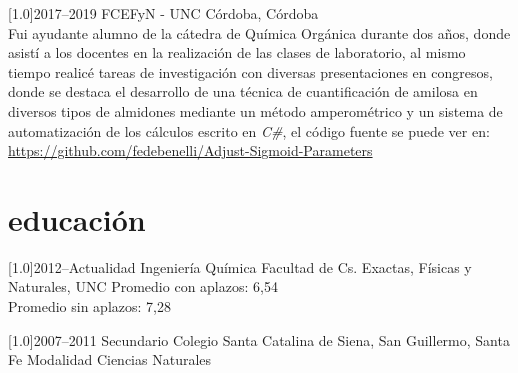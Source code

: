 \documentclass[espanol]{cv-style}     %
\begin{document}
\begin{entrylist}
\entry
  {\scalebox{.8}[1.0]{2017--2019}}
  {FCEFyN - UNC}
  {Córdoba, Córdoba}  {\\
	  Fui ayudante alumno de la cátedra de Química Orgánica durante dos años, donde asistí a los docentes en la realización de las clases de laboratorio, al mismo tiempo realicé tareas de investigación con diversas presentaciones en congresos, donde se destaca el desarrollo de una técnica de cuantificación de amilosa en diversos tipos de almidones mediante un método amperométrico y un sistema de automatización de los cálculos escrito en \textit{C\#}, el código fuente se puede ver en: 
	  \url{https://github.com/fedebenelli/Adjust-Sigmoid-Parameters} 
  }

\end{entrylist}

\newpage




\section{educación}
\begin{entrylist}

\entry
{\scalebox{.8}[1.0]{2012--Actualidad}}
{Ingeniería Química}
{Facultad de Cs. Exactas, Físicas y Naturales, UNC}
{
\noindent Promedio con aplazos: 6,54\\
Promedio sin aplazos: 7,28\\
}

\entry
{\scalebox{.8}[1.0]{2007--2011}}
{Secundario}
{Colegio Santa Catalina de Siena, San Guillermo, Santa Fe}
{Modalidad Ciencias Naturales}

\end{entrylist}

\end{document}
